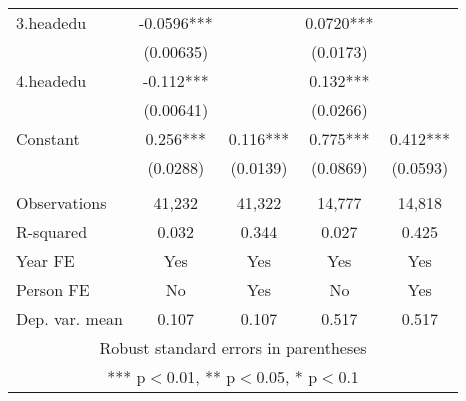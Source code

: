 \begin{tabular}{lcccc}
3.headedu & -0.0596*** &  & 0.0720*** &  \\
 & (0.00635) &  & (0.0173) &  \\
4.headedu & -0.112*** &  & 0.132*** &  \\
 & (0.00641) &  & (0.0266) &  \\
Constant & 0.256*** & 0.116*** & 0.775*** & 0.412*** \\
 & (0.0288) & (0.0139) & (0.0869) & (0.0593) \\
 &  &  &  &  \\
Observations & 41,232 & 41,322 & 14,777 & 14,818 \\
R-squared & 0.032 & 0.344 & 0.027 & 0.425 \\
Year FE & Yes & Yes & Yes & Yes \\
Person FE & No & Yes & No & Yes \\
 Dep. var. mean & 0.107 & 0.107 & 0.517 & 0.517 \\ \hline
\multicolumn{5}{c}{ Robust standard errors in parentheses} \\
\multicolumn{5}{c}{ *** p$<$0.01, ** p$<$0.05, * p$<$0.1} \\
\end{tabular}
